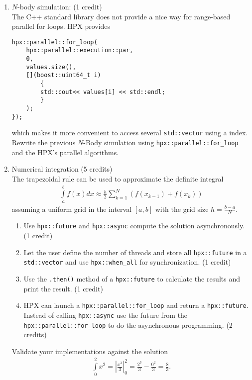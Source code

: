 \documentclass[11pt]{article}
\begin{document}
\begin{enumerate}

\item $N$-body simulation: (1 credit)\\
The C++ standard library does not provide a nice way for range-based parallel for loops. HPX provides
\begin{lstlisting}
hpx::parallel::for_loop(
	hpx::parallel::execution::par, 
	0, 
	values.size(),
	[](boost::uint64_t i)
		{
		std::cout<< values[i] << std::endl;
		}
	);
});
\end{lstlisting} 
which makes it more convenient to access several \lstinline|std::vector| using a index. Rewrite the previous $N$-Body simulation using \lstinline|hpx::parallel::for_loop| and the HPX's parallel algorithms.

\item Numerical integration (5 credits)\\
The trapezoidal rule can be used to approximate the definite integral 
\begin{align*}
\int\limits_a^b f(x) dx \approx \frac{h}{2} \sum\limits_{k=1}^N (f(x_{k-1}) + f(x_k))
\end{align*}
assuming a uniform grid in the interval $[a,b]$ with the grid size $h=\frac{b-a}{N}$.
\begin{enumerate}
\item Use \lstinline|hpx::future| and \lstinline|hpx::async| compute the solution asynchronously. (1 credit)
\item Let the user define the number of threads and store all \lstinline|hpx::future| in a \lstinline|std::vector| and use \lstinline|hpx::when_all| for synchronization. (1 credit)
\item Use the \lstinline|.then()| method of a \lstinline|hpx::future| to calculate the results and print the result. (1 credit)
\item HPX can launch a \lstinline|hpx::parallel::for_loop| and return a \lstinline|hpx::future|. Instead of calling \lstinline|hpx::async| use the future from the \lstinline|hpx::parallel::for_loop| to do the asynchronous programming. (2 credits)  
\end{enumerate}
Validate your implementations against the solution 
\begin{align*}
\int\limits_0^2 x^2 = \left\vert \frac{x^3}{3}\right\vert_0^2 = \frac{2^3}{3} - \frac{0^2}{3} = \frac{8}{3}\text{.}
\end{align*}






\end{enumerate}
\doclicenseThis 
\end{document}
